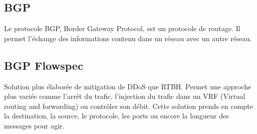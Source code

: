 \subsection{BGP}
Le protocole BGP, Border Gateway Protocol, est un protocole de routage. Il permet l'échange des informations contenu dans un réseau avec un autre réseau.


\subsection{BGP Flowspec}
Solution plus élaborée de mitigation de DDoS que RTBH.
Permet une approche plus variée comme l'arrêt du trafic, l'injection du trafic dans un VRF (Virtual routing and forwarding) ou contrôler son débit. Cette solution prends en compte la destination, la source, le protocole, les ports ou encore la longueur des messages pour agir.
